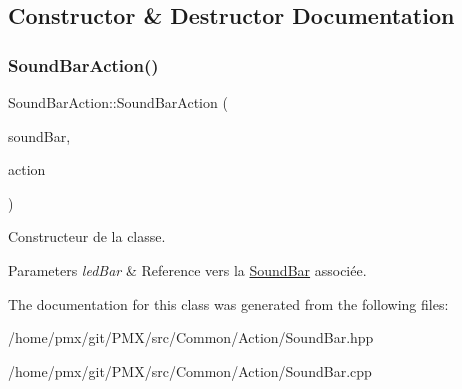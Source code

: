 \subsection{Constructor \& Destructor Documentation}
\mbox{\label{classSoundBarAction_ab41056739f81ce59ff1eb834901c7ac8}} 
\subsubsection{\texorpdfstring{Sound\+Bar\+Action()}{SoundBarAction()}}
{\footnotesize\ttfamily Sound\+Bar\+Action\+::\+Sound\+Bar\+Action (\begin{DoxyParamCaption}\item[{\hyperlink{classSoundBar}{Sound\+Bar} \&}]{sound\+Bar,  }\item[{Sound\+Bar\+Action\+Name}]{action }\end{DoxyParamCaption})}



Constructeur de la classe. 


\begin{DoxyParams}{Parameters}
{\em led\+Bar} & Reference vers la \hyperlink{classSoundBar}{Sound\+Bar} associée. \\
\hline
\end{DoxyParams}


The documentation for this class was generated from the following files\+:\begin{DoxyCompactItemize}
\item 
/home/pmx/git/\+P\+M\+X/src/\+Common/\+Action/Sound\+Bar.\+hpp\item 
/home/pmx/git/\+P\+M\+X/src/\+Common/\+Action/Sound\+Bar.\+cpp\end{DoxyCompactItemize}
